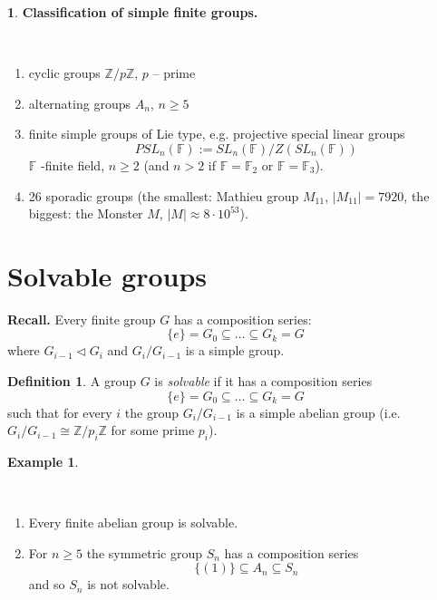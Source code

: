\documentclass[12pt, letterpaper, oneside]{article}
\theoremstyle{plain}
\theoremstyle{definition}
\newtheorem{definition}[theorem]{Definition}
\newtheorem{example}[theorem]{Example}
\newtheorem{nn}[theorem]{}
\newcommand{\Z}{{\mathbb Z}}
\newcommand{\F}{{\mathbb F}}
\newcommand{\benu}{\begin{enumerate}}
\newcommand{\eenu}{\end{enumerate}}
\newcommand{\vs}{\vskip 5mm}
\newcommand{\isep}[1][0]{\setlength{\itemsep}{#1 mm}}
\begin{document}
\vs



\begin{nn} \textbf{Classification of simple finite groups.}

\vskip -13mm

\ 
\benu
\isep
\item cyclic groups $\Z/p\Z$, $p$ -- prime
\item alternating groups $A_{n}$, $n\geq 5$ 
\item finite simple groups of Lie type, e.g. projective special linear groups
$$PSL_{n}(\F) := SL_{n}(\F)/Z(SL_{n}(\F))$$
$\F$ -finite field, $n\geq 2$ (and $n>2$ if $\F = \F_{2}$ or $\F = \F_{3}$).
\item 26 sporadic groups (the smallest: Mathieu group $M_{11}$, $|M_{11}| =7920$, 
the biggest: the Monster $M$, $|M|\approx 8\cdot 10^{53}$).
\eenu

\end{nn}





\newpage
\section{Solvable groups}
\label{SEC_SOLVGPS}

\textbf{Recall.} Every finite group $G$ has a composition series:
$$\{e\}= G_{0} \subseteq {\dots} \subseteq G_{k} = G$$
where $G_{i-1}\lhd G_{i}$ and $G_{i}/G_{i-1}$ is a simple group. 

\vs\vs


\begin{definition}
A group $G$ is \emph{solvable} if it has a composition series
$$\{e\}= G_{0} \subseteq {\dots} \subseteq G_{k} = G$$
such that for every $i$ the group $G_{i}/G_{i-1}$ is a simple abelian group
(i.e. $G_{i}/G_{i-1}\cong \Z/p_{i}\Z$ for some prime $p_{i}$). 
\end{definition}


\vs\vs

\begin{example}\ 

\vskip -13mm 

\ 
\benu
\item Every finite abelian group is solvable. 
\item For $n\geq 5$ the symmetric group $S_{n}$ has a  composition series 
$$\{(1)\} \subseteq A_{n} \subseteq S_{n}$$
and so $S_{n}$ is not solvable. 
\eenu

\end{example}
\end{document}

